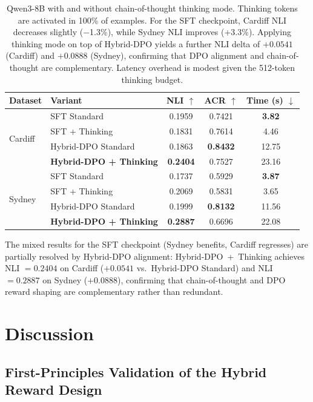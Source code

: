 \begin{table}[h]
\centering
\small
\begin{tabular}{l|l|c|c|c}
\toprule
Dataset & Variant & NLI $\uparrow$ & ACR $\uparrow$ & Time (s) $\downarrow$ \\
\midrule
\multirow{4}{*}{Cardiff} & SFT Standard & 0.1959 & 0.7421 & \textbf{3.82} \\
 & SFT + Thinking & 0.1831 & 0.7614 & 4.46 \\
 & Hybrid-DPO Standard & 0.1863 & \textbf{0.8432} & 12.75 \\
 & \textbf{Hybrid-DPO + Thinking} & \textbf{0.2404} & 0.7527 & 23.16 \\
\midrule
\multirow{4}{*}{Sydney} & SFT Standard & 0.1737 & 0.5929 & \textbf{3.87} \\
 & SFT + Thinking & 0.2069 & 0.5831 & 3.65 \\
 & Hybrid-DPO Standard & 0.1999 & \textbf{0.8132} & 11.56 \\
 & \textbf{Hybrid-DPO + Thinking} & \textbf{0.2887} & 0.6696 & 22.08 \\
\bottomrule
\end{tabular}
\caption{Qwen3-8B with and without chain-of-thought thinking mode. Thinking tokens are activated in 100\% of examples. For the SFT checkpoint, Cardiff NLI decreases slightly ($-$1.3\%), while Sydney NLI improves (+3.3\%). Applying thinking mode on top of Hybrid-DPO yields a further NLI delta of $+0.0541$ (Cardiff) and $+0.0888$ (Sydney), confirming that DPO alignment and chain-of-thought are complementary. Latency overhead is modest given the 512-token thinking budget.}
\label{tab:thinking}
\end{table}

The mixed results for the SFT checkpoint (Sydney benefits, Cardiff regresses) are partially resolved by Hybrid-DPO alignment: Hybrid-DPO~+~Thinking achieves NLI $= 0.2404$ on Cardiff ($+0.0541$ vs.\ Hybrid-DPO Standard) and NLI $= 0.2887$ on Sydney ($+0.0888$), confirming that chain-of-thought and DPO reward shaping are complementary rather than redundant.

\section{Discussion}
\label{sec:discussion}

\subsection{First-Principles Validation of the Hybrid Reward Design}
\label{sec:first_principles_validation}

